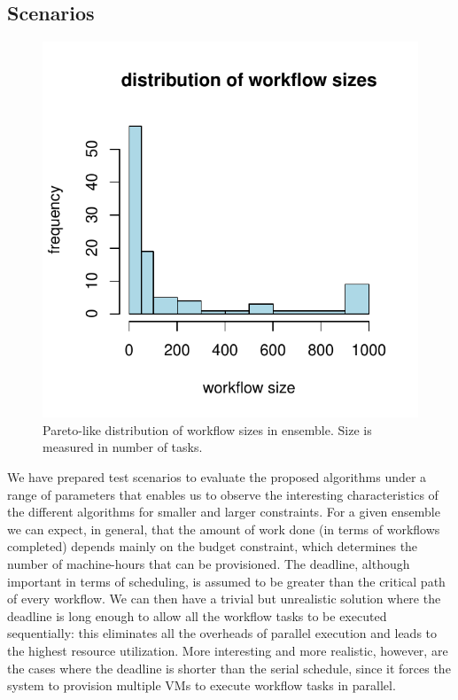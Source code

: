 \documentclass{sig-alternate}
\begin{document}
\subsection{Scenarios}
\label{sec:scenarios}

\begin{figure}[tb] 
\centering
\includegraphics[width=0.6\columnwidth]{figures/ensemble-pareto}
\caption{Pareto-like distribution of workflow sizes in ensemble. Size is
measured in number of tasks.}
\label{fig:ensemble-distribution}
\end{figure}


We have prepared test scenarios to evaluate the proposed algorithms under a
range of parameters that enables us to observe the interesting characteristics
of the different algorithms for smaller and larger constraints. For a given
ensemble we can expect, in general, that the amount of work done (in terms of
workflows completed) depends mainly on the budget constraint, which determines
the number of machine-hours that can be provisioned. The deadline, although
important in terms of scheduling, is assumed to be greater than the critical
path of every workflow. We can then have a trivial but unrealistic solution
where the deadline  is long enough to allow all the workflow tasks to be
executed sequentially: this eliminates all the overheads of parallel execution
and leads to the highest resource utilization. More interesting and more
realistic, however, are the cases where the deadline is shorter than the serial
schedule, since it forces the system to provision multiple VMs to execute
workflow tasks in parallel.
\end{document}
